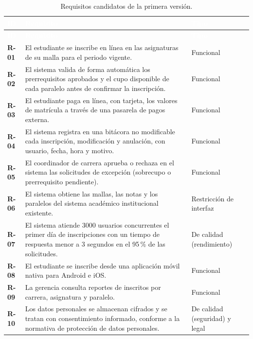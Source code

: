 \documentclass[12pt,a4paper]{article}
\newcommand{\cabecera}[1]{
    \textcolor{white}{\textbf{#1}}
}
\begin{document}
\begin{longtable}{
    C{1.2cm}
    L{9.3cm}
    L{3.5cm}
}

\caption{Requisitos candidatos de la primera versión.}
\label{tab:requisitos-candidatos}\\

\cabecera{ID} &
\cabecera{Requisito} &
\cabecera{Tipo} \\

\endfirsthead

\cabecera{ID} &
\cabecera{Requisito} &
\cabecera{Tipo} \\

\endhead

\bottomrule

\endfoot

\textbf{R-01} &
El estudiante se inscribe en línea en las asignaturas
de su malla para el periodo vigente. &
Funcional \\

\textbf{R-02} &
El sistema valida de forma automática los prerrequisitos
aprobados y el cupo disponible de cada paralelo antes
de confirmar la inscripción. &
Funcional \\

\textbf{R-03} &
El estudiante paga en línea, con tarjeta, los valores
de matrícula a través de una pasarela de pagos externa. &
Funcional \\

\textbf{R-04} &
El sistema registra en una bitácora no modificable
cada inscripción, modificación y anulación, con
usuario, fecha, hora y motivo. &
Funcional \\

\textbf{R-05} &
El coordinador de carrera aprueba o rechaza en el
sistema las solicitudes de excepción (sobrecupo o
prerrequisito pendiente). &
Funcional \\

\textbf{R-06} &
El sistema obtiene las mallas, las notas y los
paralelos del sistema académico institucional
existente. &
Restricción de interfaz \\

\textbf{R-07} &
El sistema atiende 3000 usuarios concurrentes el
primer día de inscripciones con un tiempo de respuesta
menor a 3 segundos en el 95\,\% de las solicitudes. &
De calidad (rendimiento) \\

\textbf{R-08} &
El estudiante se inscribe desde una aplicación móvil
nativa para Android e iOS. &
Funcional \\

\textbf{R-09} &
La gerencia consulta reportes de inscritos por
carrera, asignatura y paralelo. &
Funcional \\

\textbf{R-10} &
Los datos personales se almacenan cifrados y se
tratan con consentimiento informado, conforme a la
normativa de protección de datos personales. &
De calidad (seguridad) y legal \\

\end{longtable}
\end{document}
